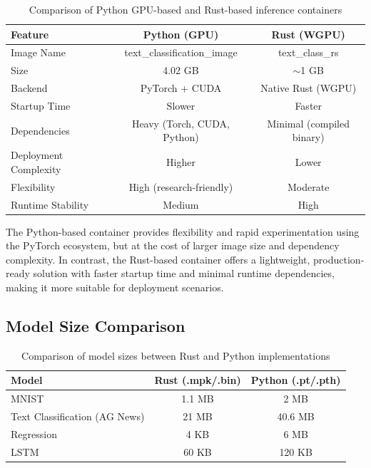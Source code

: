 \documentclass{ieeeaccess}
\begin{document}
\begin{table}[t!]
\centering
\begin{tabular}{|l|c|c|}
\hline
\textbf{Feature} & \textbf{Python (GPU)} & \textbf{Rust (WGPU)} \\
\hline
Image Name & text\_classification\_image & text\_class\_rs \\
\hline
Size & 4.02 GB & $\sim$1 GB \\
\hline
Backend & PyTorch + CUDA & Native Rust (WGPU) \\
\hline
Startup Time & Slower & Faster \\
\hline
Dependencies & Heavy (Torch, CUDA, Python) & Minimal (compiled binary) \\
\hline
Deployment Complexity & Higher & Lower \\
\hline
Flexibility & High (research-friendly) & Moderate \\
\hline
Runtime Stability & Medium & High \\
\hline
\end{tabular}
\caption{Comparison of Python GPU-based and Rust-based inference containers}
\end{table}

\noindent
The Python-based container provides flexibility and rapid experimentation using the PyTorch ecosystem, but at the cost of larger image size and dependency complexity. In contrast, the Rust-based container offers a lightweight, production-ready solution with faster startup time and minimal runtime dependencies, making it more suitable for deployment scenarios.


\subsection{Model Size Comparison}

\begin{table}[t!]
\centering
\begin{tabular}{|l|c|c|}
\hline
\textbf{Model} & \textbf{Rust (.mpk/.bin)} & \textbf{Python (.pt/.pth)} \\
\hline
MNIST & 1.1 MB & 2 MB \\
\hline
Text Classification (AG News) & 21 MB & 40.6 MB \\
\hline
Regression & 4 KB & 6 MB \\
\hline
LSTM & 60 KB & 120 KB \\
\hline
\end{tabular}
\caption{Comparison of model sizes between Rust and Python implementations}
\end{table}
\end{document}
